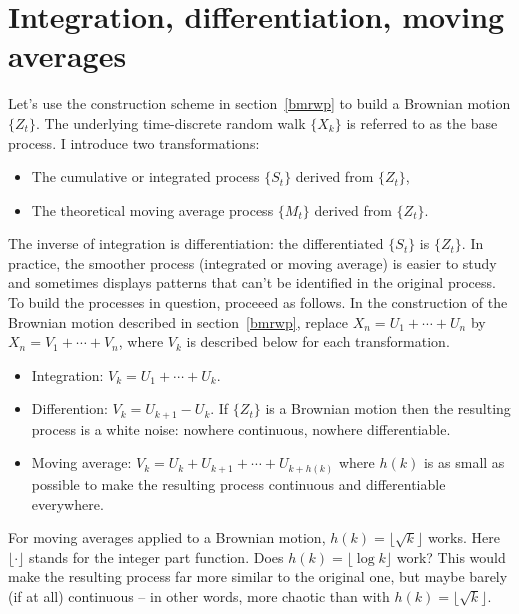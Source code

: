 \documentclass[oneside,10pt]{book}
\begin{document}
\section{Integration, differentiation, moving averages}\label{movbc}

Let's use the construction scheme in section~\ref{bmrwp} to build a Brownian motion $\{Z_t\}$.
The underlying time-discrete random walk $\{X_k\}$ is referred to as the base process.
I introduce two transformations:\vspace{1ex}
\begin{itemize}
	\item The cumulative or \textcolor{index}{integrated process} $\{ S_t \}$ derived from $\{ Z_t \}$,
	\item The theoretical \textcolor{index}{moving average process} $\{ M_t \}$ derived from $\{ Z_t \}$.
\end{itemize}\vspace{1ex}
The inverse of integration is differentiation: the \textcolor{index}{differentiated} $\{S_t\}$ is $\{Z_t\}$. In practice, the smoother process (integrated or moving average) is easier to study and sometimes displays patterns that can't be identified in the original process.
To build the processes in question, proceeed as follows.
In the construction of the Brownian motion described in section~\ref{bmrwp}, replace
$X_n = U_1 + \cdots + U_n$ by
$X_n = V_1 + \cdots + V_n$, where $V_k$ is described below for each transformation. \vspace{1ex}
\begin{itemize}
	\item Integration: $V_k = U_1 + \cdots + U_k$.
	\item Differention: $V_k = U_{k+1} - U_k$. If $\{ Z_t \}$ is a Brownian motion  then the resulting process is a white noise: nowhere continuous, nowhere differentiable.
	\item Moving average: $V_k = U_k + U_{k + 1} + \cdots + U_{k + h(k)}$ where $h(k)$ is as small as possible to make the resulting process continuous and differentiable everywhere.
\end{itemize}\vspace{1ex}
For moving averages applied to a Brownian motion, $h(k) = \lfloor \sqrt{k}\rfloor$ works. Here $\lfloor \cdot \rfloor$ stands for the integer part function. Does $h(k) = \lfloor \log k \rfloor$ work? This would make the resulting process far more similar to the original one, but maybe barely (if at all) continuous -- in other words, more chaotic than with $h(k) =  \lfloor\sqrt{k} \rfloor$.
\end{document}
